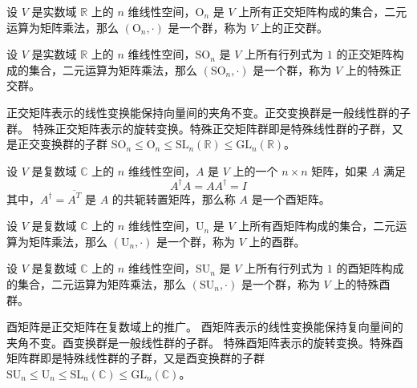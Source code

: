 \begin{definition}
    设 $V$ 是实数域 $\mathbb{R}$ 上的 $n$ 维线性空间，$\mathrm{O}_n$ 是 $V$ 上所有正交矩阵构成的集合，二元运算为矩阵乘法，那么 $(\mathrm{O}_n, \cdot)$ 是一个群，称为 $V$ 上的正交群。
\end{definition}

\begin{definition}
    设 $V$ 是实数域 $\mathbb{R}$ 上的 $n$ 维线性空间，$\mathrm{SO}_n$ 是 $V$ 上所有行列式为 $1$ 的正交矩阵构成的集合，二元运算为矩阵乘法，那么 $(\mathrm{SO}_n, \cdot)$ 是一个群，称为 $V$ 上的特殊正交群。
\end{definition}
\begin{note}
    正交矩阵表示的线性变换能保持向量间的夹角不变。正交变换群是一般线性群的子群。
    特殊正交矩阵表示的旋转变换。特殊正交矩阵群即是特殊线性群的子群，又是正交变换群的子群 $\mathrm{SO}_n \leq \mathrm{O}_n \leq \mathrm{SL}_n(\mathbb{R})\leq \mathrm{GL}_n(\mathbb{R})$。
\end{note}
\vspace{0.5em}

\begin{definition}
    设 $V$ 是复数域 $\mathbb{C}$ 上的 $n$ 维线性空间，$A$ 是 $V$ 上的一个 $n\times n$ 矩阵，如果 $A$ 满足
    \[
        A^{\dagger} A = A A^{\dagger} = I
    \]
    其中，$A^{\dagger} = \overline{A^T}$ 是 $A$ 的共轭转置矩阵，那么称 $A$ 是一个酉矩阵。
\end{definition}

\begin{definition}
    设 $V$ 是复数域 $\mathbb{C}$ 上的 $n$ 维线性空间，$\mathrm{U}_n$ 是 $V$ 上所有酉矩阵构成的集合，二元运算为矩阵乘法，那么 $(\mathrm{U}_n, \cdot)$ 是一个群，称为 $V$ 上的酉群。
\end{definition}

\begin{definition}
    设 $V$ 是复数域 $\mathbb{C}$ 上的 $n$ 维线性空间，$\mathrm{SU}_n$ 是 $V$ 上所有行列式为 $1$ 的酉矩阵构成的集合，二元运算为矩阵乘法，那么 $(\mathrm{SU}_n, \cdot)$ 是一个群，称为 $V$ 上的特殊酉群。
\end{definition}

\begin{note}
    酉矩阵是正交矩阵在复数域上的推广。
    酉矩阵表示的线性变换能保持复向量间的夹角不变。酉变换群是一般线性群的子群。
    特殊酉矩阵表示的旋转变换。特殊酉矩阵群即是特殊线性群的子群，又是酉变换群的子群 $\mathrm{SU}_n \leq \mathrm{U}_n \leq \mathrm{SL}_n(\mathbb{C}) \leq \mathrm{GL}_n(\mathbb{C})$。
\end{note}

